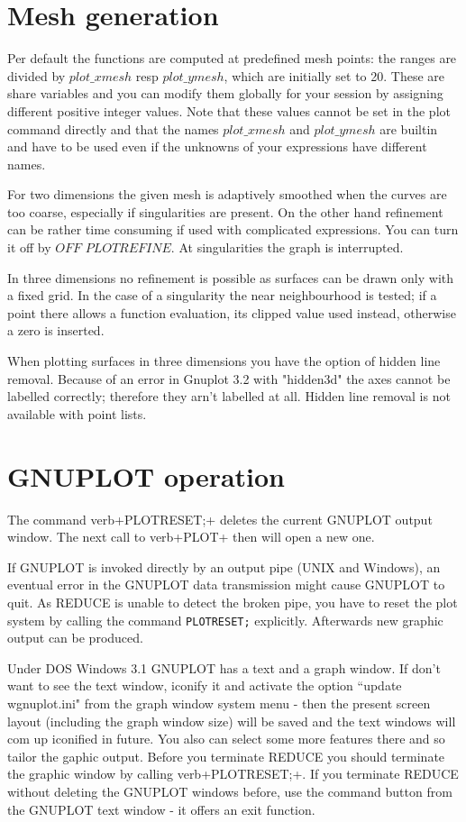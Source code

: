 \section{Mesh generation}

Per default the functions are computed  at predefined
mesh points: the ranges are divided by $plot\_xmesh$ resp
$plot\_ymesh$, which are initially set to 20. These are
share variables and you can modify them globally for your
session by assigning different positive integer values. 
Note that these values cannot be set in the plot command directly and
that the names $plot\_xmesh$ and $plot\_ymesh$ are
builtin and have to be used even if the unknowns of your
expressions have different names.

For two dimensions the given mesh is adaptively
smoothed when the curves are too coarse, especially 
if singularities are present. On the other hand
refinement can be rather time consuming if used with
complicated expressions. You can turn it off by 
$OFF$ $PLOTREFINE$. At singularities the graph is
interrupted.

In three dimensions no refinement is possible as surfaces
can be drawn only with a fixed grid. In the case
of a singularity the near neighbourhood is
tested; if a point there allows a function evaluation, its 
clipped value used instead, otherwise a zero is inserted.

When plotting surfaces in three dimensions you have the
option of hidden line removal. Because of an error in
Gnuplot 3.2 with "hidden3d" the axes cannot be labelled
correctly; therefore they arn't labelled at all. Hidden line
removal is not available with point lists.


\section{GNUPLOT operation}

The command verb+PLOTRESET;+ deletes the current GNUPLOT output
window. The next call to verb+PLOT+ then will open a new one.

If GNUPLOT is invoked directly by an output pipe (UNIX and Windows),
an eventual error in the GNUPLOT data transmission might cause GNUPLOT to
quit. As {\small REDUCE} is unable to detect the broken pipe, you
have to reset the plot system by calling the 
command \verb+PLOTRESET;+ explicitly. Afterwards new graphic output
can be produced. 

Under DOS Windows 3.1 GNUPLOT has a text and a graph window.
If don't want to see the text window, iconify it and
activate the option ``update wgnuplot.ini" from the
graph window system menu - then the present screen layout
(including the graph window size) will be saved and the text
windows will com up iconified in future. You also can select 
some more features there and so tailor the gaphic output.
Before you terminate {\small REDUCE} you should terminate the
graphic window by calling verb+PLOTRESET;+.
If you terminate {\small REDUCE} without deleting the
GNUPLOT windows before, use the command button from the
GNUPLOT text window - it offers an exit function.

